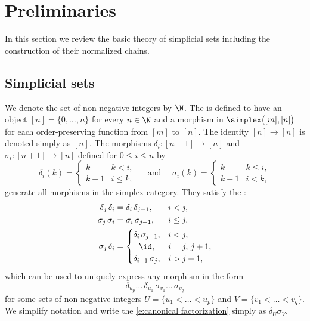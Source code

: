
\section{Preliminaries}\label{s:preliminaries}

In this section we review the basic theory of simplicial sets including the construction of their normalized chains.

\subsection{Simplicial sets}

We denote the set of non-negative integers by $\N$.
The  is defined to have an object $[n] = \{0, \dots, n\}$ for every $n \in \N$ and a morphism in $\simplex \big([m], [n] \big)$ for each order-preserving function from $[m]$ to $[n]$.
The identity $[n] \to [n]$ is denoted simply as $[n]$.
The morphisms $\delta_i \colon [n-1] \to [n]$ and $\sigma_i \colon [n+1] \to [n]$ defined for $0 \leq i \leq n$ by
\[
\delta_i(k) =
\begin{cases} k & k < i, \\ k+1 & i \leq k, \end{cases}
\quad \text{ and } \quad
\sigma_i(k) =
\begin{cases} k & k \leq i, \\ k-1 & i < k, \end{cases}
\]
generate all morphisms in the simplex category.
They satisfy the :
\begin{equation}\label{e:cosimplicial identities}
	\begin{split}
	\delta_j \, \delta_i &=
	\delta_i \, \delta_{j-1}, \hspace*{18.3pt} i < j, \\
	\sigma_j \, \sigma_i &=
	\sigma_i \, \sigma_{j+1}, \hspace*{15.9pt} i \leq j, \\
	\sigma_j \, \delta_i &=
	\begin{cases}
	\delta_i \, \sigma_{j-1}, & i < j, \\
	\hfil \id, & i = j,\, j+1, \\
	\delta_{i-1} \, \sigma_{j}, & i > j + 1,
	\end{cases}
	\end{split}
\end{equation}
which can be used to uniquely express any morphism in the form
\begin{equation}\label{e:canonical factorization}
	\delta_{u_{p}} \dots\, \delta_{u_1}\, \sigma_{v_1} \dots\, \sigma_{v_q}
\end{equation}
for some sets of non-negative integers $U = \{u_1 < \dots < u_{p}\}$ and $V = \{v_1 < \dots < v_{q}\}$.
We simplify notation and write the  \eqref{e:canonical factorization} simply as $\delta_U \sigma_V$.

